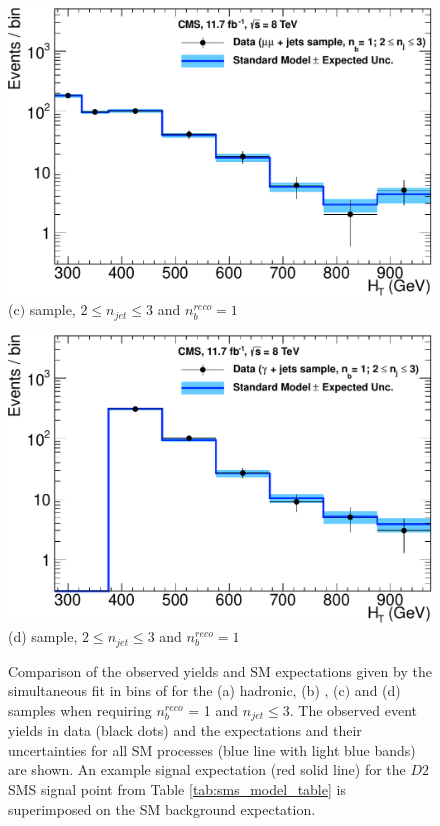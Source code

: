 \begin{figure}[ht]
\begin{minipage}[b]{0.48 \linewidth}
\includegraphics[width = 1.0\linewidth]{plots/mumu_1b_le3j_logy.pdf}
\centering (c$)$ \dimupjets sample, $2 \leq n_{jet} \leq 3$ and $n_{b}^{reco} = 1$ 
\end{minipage}
\quad
\begin{minipage}[b]{0.48\linewidth}
\includegraphics[width = 1.0\linewidth]{plots/photon_1b_le3j_logy.pdf}
\centering (d)  \gpjets sample, $2 \leq n_{jet} \leq 3$ and $n_{b}^{reco} = 1$ 
\end{minipage}
\caption[Comparison of the observed yields and \ac{SM} expectations given by the simultaneous fit in bins of \theht for the (a) hadronic, (b) \mupjets, (c$)$ \dimupjets and (d) \gpjets samples when requiring $n_{b}^{reco}$ = 1 and $n_{jet} \leq 3$.]{Comparison of the observed yields and \ac{SM} expectations given by the simultaneous fit in bins of \theht for the (a) hadronic, (b) \mupjets, (c$)$ \dimupjets and (d) \gpjets samples when requiring $n_{b}^{reco}$ = 1 and $n_{jet} \leq 3$. The observed event yields in data (black dots) and the expectations and their uncertainties for all SM processes (blue line with light blue bands) are shown. An example signal expectation (red solid line) for the $D2$ \ac{SMS} signal point from Table \ref{tab:sms_model_table} is superimposed on the \ac{SM} background expectation.}
\label{fig:result1blow}
\end{figure}

